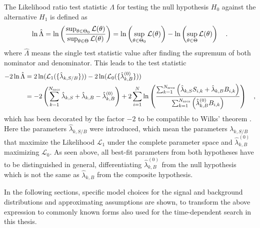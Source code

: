 The Likelihood ratio test statistic $\Lambda$ for testing the null hypothesis $H_0$ against the alternative $H_1$ is defined as 
\begin{equation}
  \ln\hat{\Lambda} = \ln\left(\frac{\sup_{\theta \in \Theta_0} \mathcal{L}(\theta)}
                          {\sup_{\theta \in \Theta} \mathcal{L}(\theta)}\right)
  = \ln\left(\sup_{\theta \in \Theta_0} \mathcal{L}(\theta)\right) -
    \ln\left(\sup_{\theta \in \Theta} \mathcal{L}(\theta)\right)
  \quad\text{.}
\end{equation}
where $\hat{\Lambda}$ means the single test statistic value after finding the supremum of both nominator and denominator.
This leads to the test statistic
\begin{equation}
  \begin{aligned}
    -2\ln\hat{\Lambda}
    &= 2\ln(\mathcal{L}_1(\{\hat{\lambda}_{k,S/B}\})) -
       2\ln(\mathcal{L}_0(\{\hat{\lambda}^{(0)}_{k,B}\})) \\
    &= -2\left(\sum_{k=1}^{N_\text{srcs}}\hat{\lambda}_{k,S} +
                                         \hat{\lambda}_{k,B} -
                                         \hat{\lambda}_{k,B}^{(0)}\right) +
      2\sum_{i=1}^N \ln\left(
        \frac{\sum_{k=1}^{N_\text{srcs}}\left(
            \hat{\lambda}_{k,S} S_{i,k}+\hat{\lambda}_{k,B} B_{i,k}\right)}
            {\sum_{k=1}^{N_\text{srcs}}\left(
              \hat{\lambda}_{k,B}^{(0)} B_{i,k}
            \right)}
          \right)
    \quad\text{,}
  \end{aligned}
\end{equation}
which has been decorated by the factor $-2$ to be compatible to Wilks' theorem .
Here the parameters $\hat{\lambda}_{k,S/B}$ were introduced, which mean the parameters $\lambda_{k,S/B}$ that maximize the Likelihood $\mathcal{L}_1$ under the complete parameter space and $\hat{\lambda}_{k,B}^{(0)}$ maximizing $\mathcal{L}_0$.
As seen above, all best-fit parameters from both hypotheses have to be distinguished in general, differentiating $\hat{\lambda}_{k,B}^{(0)}$ from the null hypothesis which is not the same as $\hat{\lambda}_{k,B}$ from the composite hypothesis.

In the following sections, specific model choices for the signal and background distributions and approximating assumptions are shown, to transform the above expression to commonly known forms also used for the time-dependent search in this thesis.


